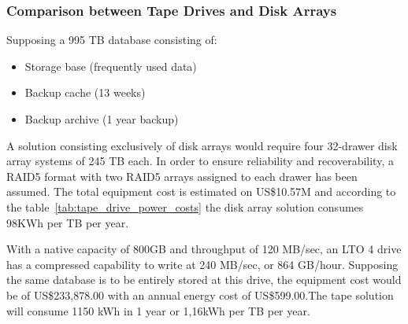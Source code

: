             \subsubsection*{Comparison between Tape Drives and Disk Arrays}
                Supposing a 995 TB database consisting of:
                \begin{itemize}
                	\item Storage base (frequently used data)
                	\item Backup cache (13 weeks)
                	\item Backup archive (1 year backup)
                \end{itemize}
                A solution consisting exclusively of disk arrays would require four 32-drawer disk array systems of 245 TB each. In order to ensure reliability and recoverability, a RAID5 format with two RAID5 arrays assigned to each drawer has been assumed. The total equipment cost is estimated on US\$10.57M \cite{Reine08} and according to the table~\ref{tab:tape_drive_power_costs} the disk array solution consumes 98KWh per TB per year.
                \begin{table}[h!tb]
                \centering 
                \label{tab:tape_drive_power_costs} %
                \end{table}
                With a native capacity of 800GB and throughput of 120 MB/sec, an LTO 4 drive has a compressed capability to write at 240 MB/sec, or 864 GB/hour. Supposing the same database is to be entirely stored at this drive, the equipment cost would be of US\$233,878.00 with an annual energy cost of US\$599.00.The tape solution will consume 1150 kWh in 1 year or 1,16kWh per TB per year.
